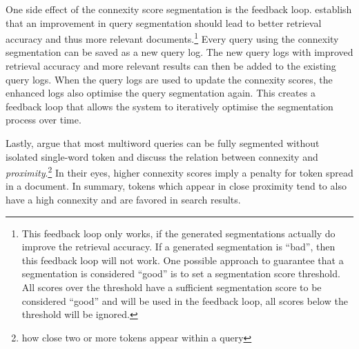 One side effect of the connexity score segmentation is the feedback loop. \citeauthor{Risvik:2003} establish that an improvement in query segmentation should lead to better retrieval accuracy and thus more relevant documents.\footnote{This feedback loop only works, if the generated segmentations actually do improve the retrieval accuracy. If a generated segmentation is ``bad'', then this feedback loop will not work. One possible approach to guarantee that a segmentation is considered ``good'' is to set a segmentation score threshold. All scores over the threshold have a sufficient segmentation score to be considered ``good'' and will be used in the feedback loop, all scores below the threshold will be ignored.} Every query using the connexity segmentation can be saved as a new query log. The new query logs with improved retrieval accuracy and more relevant results can then be added to the existing query logs. When the query logs are used to update the connexity scores, the enhanced logs also optimise the query segmentation again. This creates a feedback loop that allows the system to iteratively optimise the segmentation process over time.

Lastly, \citeauthor{Risvik:2003} argue that most multiword queries can be fully segmented without isolated single-word token and discuss the relation between connexity and \textit{proximity}.\footnote{how close two or more tokens appear within a query} In their eyes, higher connexity scores imply a penalty for token spread in a document. In summary, tokens which appear in close proximity tend to also have a high connexity and are favored in search results.